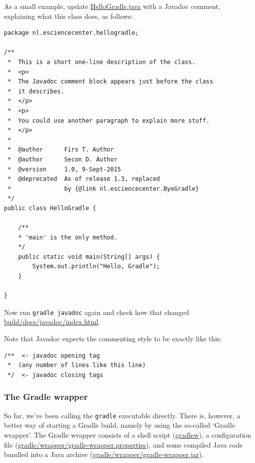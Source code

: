 \documentclass[12pt, a4paper, twoside,openany,titlepage]{article}
\begin{document}
As a small example, update \url{HelloGradle.java} with a Javadoc comment, explaining what this class does, as follows:
\begin{lstlisting}[style=basic,style=bash]
package nl.esciencecenter.hellogradle;

/**
 *  This is a short one-line description of the class.
 *  <p>
 *  The Javadoc comment block appears just before the class
 *  it describes.
 *  </p>
 *  <p>
 *  You could use another paragraph to explain more stuff.
 *  </p>
 *
 *  @author      Firs T. Author
 *  @author      Secon D. Author
 *  @version     1.0, 9-Sept-2015
 *  @deprecated  As of release 1.3, replaced
 *               by {@link nl.esciencecenter.ByeGradle}
 */
public class HelloGradle {

    /**
    * 'main' is the only method.
    */
    public static void main(String[] args) {
        System.out.println("Hello, Gradle");
    }

}
\end{lstlisting}

Now run \texttt{gradle javadoc} again and check how that changed \url{build/docs/javadoc/index.html}.

Note that Javadoc expects the commenting style to be exactly like this:
\begin{lstlisting}[style=basic,style=bash]
/**  <- javadoc opening tag
 *  (any number of lines like this line)
 */  <- javadoc closing tags
\end{lstlisting}



\subsubsection{The Gradle wrapper}


So far, we've been calling the \texttt{gradle} executable directly. There is, however, a better way of starting a Gradle build, namely by using the so-called `Gradle wrapper'. The Gradle wrapper consists of a shell script (\url{gradlew}), a configuration file (\url{gradle/wrapper/gradle-wrapper.properties}), and some compiled Java code bundled into a Java archive (\url{gradle/wrapper/gradle-wrapper.jar}).
\end{document}
